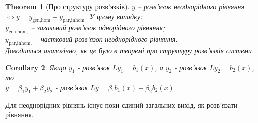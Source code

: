\documentclass[a4paper, 10pt]{article}
\theoremstyle{theoremdd}
\newtheorem{theorem}{Theorem}[subsection]
\theoremstyle{theoremdd}
\theoremstyle{theoremdd}
\theoremstyle{theoremdd}
\theoremstyle{theoremdd}
\theoremstyle{theoremdd}
\theoremstyle{theoremdd}
\theoremstyle{theoremdd}
\newtheorem{corollary}[theorem]{Corollary}
\begin{document}
\begin{theorem}[Про структуру розв'язків]
$y$ -- розв'язок неоднорідного рівняння $\iff y = y_{\text{gen,hom}} + y_{\text{par,inhom}}$. У цьому випадку: \\
$y_{\text{gen,hom,}}$ -- загальний розв'язок однорідного рівняння;\\ $y_{\text{par,inhom,}}$ -- частковий розв'язок неоднорідного рівняння.\\
\textit{Доводиться аналогічно, як це було в теоремі про структуру розв'язків системи.}
\end{theorem}

\begin{corollary}
Якщо $y_1$ - розв'язок $Ly_1 = b_1(x)$, а $y_2$ - розв'язок $Ly_2 = b_2(x)$, то\\
$y = \beta_1 y_1 + \beta_2 y_2$ - розв'язок $Ly = \beta_1 b_1(x) + \beta_2 b_2(x)$
\end{corollary}

Для неоднорідних рівнянь існує поки єдиний загальних вихід, як розв'язати рівняння.
\end{document}
